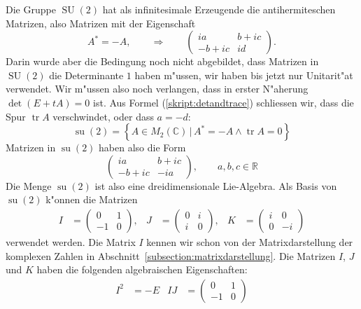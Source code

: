 \begin{beispiel}
Die Gruppe $\operatorname{SU}(2)$ hat als infinitesimale Erzeugende 
die antihermiteschen Matrizen, also Matrizen mit der Eigenschaft
\[
A^*=-A,
\qquad
\Rightarrow
\qquad
\begin{pmatrix}
   ia&b+ic\\
-b+ic&  id
\end{pmatrix}.
\]
Darin wurde aber die Bedingung noch nicht abgebildet, dass Matrizen
in $\operatorname{SU}(2)$ die Determinante $1$ haben m"ussen, wir
haben bis jetzt nur Unitarit"at verwendet. Wir m"ussen also noch
verlangen, dass in erster N"aherung $\det(E+tA)=0$ ist.
Aus Formel (\ref{skript:detandtrace}) schliessen wir, dass die Spur
$\operatorname{tr}A$ verschwindet, oder dass $a=-d$:
\begin{equation}
\operatorname{su}(2)
=
\left\{ A\in M_2(\mathbb C)\,|\,
A^*=-A\wedge \operatorname{tr}A=0
\right\}
\end{equation}
Matrizen in $\operatorname{su}(2)$ haben also die Form
\begin{equation}
\begin{pmatrix}
   ia&b+ic\\
-b+ic& -ia
\end{pmatrix},\qquad a,b,c\in\mathbb R
\end{equation}
Die Menge $\operatorname{su}(2)$ ist also eine dreidimensionale 
Lie-Algebra.
Als Basis von $\operatorname{su}(2)$ k"onnen die Matrizen
\begin{align}
I
&=
\begin{pmatrix} 0&1 \\ -1& 0 \end{pmatrix},
&
J
&=
\begin{pmatrix} 0&i \\  i& 0 \end{pmatrix},
&
K
&=
\begin{pmatrix} i&0 \\  0&-i \end{pmatrix}
\label{skript:komplex:definitionIJK}
\end{align}
verwendet werden.
Die Matrix $I$ kennen wir schon von der Matrixdarstellung der komplexen
Zahlen in Abschnitt~\ref{subsection:matrixdarstellung}.
Die Matrizen $I$, $J$ und $K$ haben die folgenden algebraischen
Eigenschaften:
\begin{align*}
I^2
&=
-E
&
IJ
&=
\begin{pmatrix} 0&1 \\ -1& 0 \end{pmatrix}

\end{align*}
\end{beispiel}
